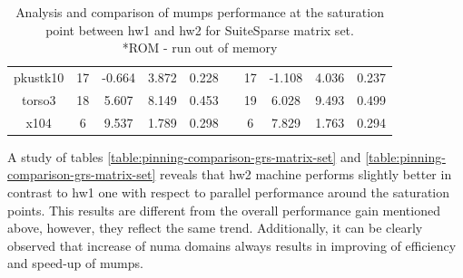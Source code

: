 \begin{table}[htpb]
\begin{tabular}{c|c|c|c|c|c|c|c|c|c|}
\multicolumn{1}{|c|}{pkustk10}                                              & 17  & -0.664                                                                & 3.872                                              & 0.228                                                  &  & 17  & -1.108                                                                & 4.036                                              & 0.237                                                  \\ \cline{1-5} \cline{7-10} 
\multicolumn{1}{|c|}{torso3}                                                & 18  & 5.607                                                                 & 8.149                                              & 0.453                                                  &  & 19  & 6.028                                                                 & 9.493                                              & 0.499                                                  \\ \cline{1-5} \cline{7-10} 
\multicolumn{1}{|c|}{x104}                                                  & 6   & 9.537                                                                 & 1.789                                              & 0.298                                                  &  & 6   & 7.829                                                                 & 1.763                                              & 0.294                                                  \\ \cline{1-5} \cline{7-10} 
\end{tabular}
\caption{Analysis and comparison of \gls{mumps} performance at the saturation point between \gls{hw1} and \gls{hw2} for SuiteSparse matrix set.\\
*ROM - run out of memory}
\label{table:pinning-comparison-suitesparse-matrix-set}
\end{table}


A study of tables \ref{table:pinning-comparison-grs-matrix-set} and \ref{table:pinning-comparison-grs-matrix-set} reveals that \gls{hw2} machine performs slightly better in contrast to \gls{hw1} one with respect to parallel performance around the saturation points. This results are different from the overall performance gain mentioned above, however, they reflect the same trend. Additionally, it can be clearly observed that increase of \gls{numa} domains always results in improving of efficiency and speed-up of \gls{mumps}.\\

